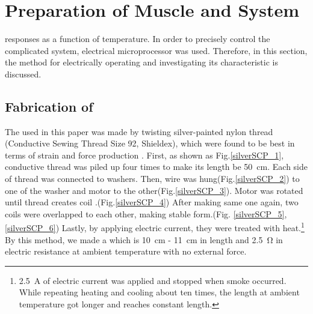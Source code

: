 \section{Preparation of Muscle and System}\label{section_preparation}
\scp responses as a function of temperature. In order to precisely control the complicated system, electrical microprocessor was used. Therefore, in this section, the method for electrically operating \scp and investigating its characteristic is discussed. 

\subsection{Fabrication of \SCP}
The \scp used in this paper was made by twisting silver-painted nylon thread (Conductive Sewing Thread Size 92, Shieldex), which were found to be best in terms of strain and force production \cite{haines}. First, as shown as Fig.\ref{silverSCP_1}, conductive thread was piled up four times to make its length be \SI{50}{\centi\meter}. Each side of thread was connected to washers. Then, wire was hung(Fig.\ref{silverSCP_2}) to one of the washer and motor to the other(Fig.\ref{silverSCP_3}). Motor was rotated until thread creates coil \cite{fab_coil}.(Fig.\ref{silverSCP_4}) After making same one again, two coils were overlapped to each other, making stable form.(Fig. \ref{silverSCP_5},\ref{silverSCP_6}) Lastly, by applying electric current, they were treated with heat.\footnote{\SI{2.5}{\ampere} of electric current was applied and stopped when smoke occurred. While repeating heating and cooling about ten times, the length at ambient temperature got longer and reaches constant length.} By this method, we made a \scp which is \SI{10}{\centi\meter} - \SI{11}{\centi\meter} in length and \SI{2.5}{\ohm} in electric resistance at ambient temperature with no external force.


